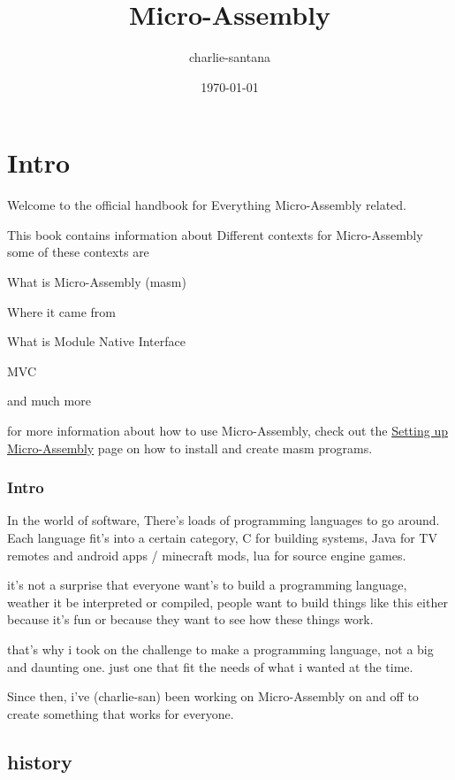 \documentclass[a4paper,11pt]{book}
\begin{document}
\title{Micro-Assembly}
\author{charlie-santana}
\date{\today}
\maketitle
\tableofcontents
\chapter{Intro}
Welcome to the official handbook for Everything Micro-Assembly related.

This book contains information about Different contexts for Micro-Assembly
some of these contexts are
\begin{list}{*}{}
	\item What is Micro-Assembly (masm)
	\item Where it came from
	\item What is Module Native Interface
	\item MVC
	\item and much more
\end{list}

for more information about how to use Micro-Assembly, check out the \hyperref[setup:masm]{Setting up Micro-Assembly} page on how to install and create masm programs.


\text 


\subsection{Intro}
In the world of software, There's loads of programming languages to go around.
Each language fit's into a certain category, C for building systems, Java for TV remotes and android apps / minecraft mods, lua for source engine games.

it's not a surprise that everyone want's to build a programming language, weather it be interpreted or compiled, people want to build things like this either because it's fun or because they want to see how these things work.

that's why i took on the challenge to make a programming language, not a big and daunting one. just one that fit the needs of what i wanted at the time.

Since then, i've (charlie-san) been working on Micro-Assembly on and off to create something that works for everyone.

\section{history}
\end{document}
